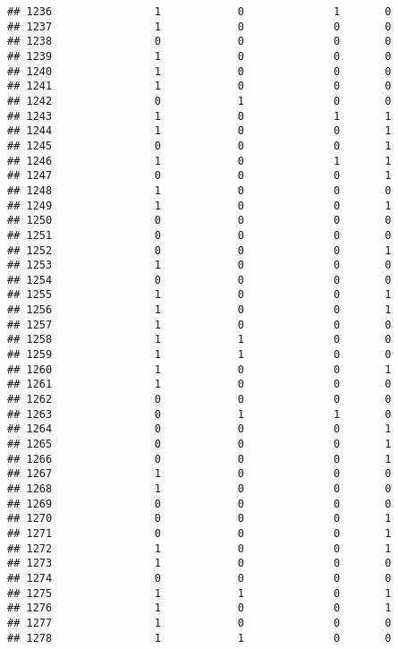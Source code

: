 \documentclass[]{article}
\begin{document}
\begin{verbatim}
## 1236                1            0              1       0
## 1237                1            0              0       0
## 1238                0            0              0       0
## 1239                1            0              0       0
## 1240                1            0              0       0
## 1241                1            0              0       0
## 1242                0            1              0       0
## 1243                1            0              1       1
## 1244                1            0              0       1
## 1245                0            0              0       1
## 1246                1            0              1       1
## 1247                0            0              0       1
## 1248                1            0              0       0
## 1249                1            0              0       1
## 1250                0            0              0       0
## 1251                0            0              0       0
## 1252                0            0              0       1
## 1253                1            0              0       0
## 1254                0            0              0       0
## 1255                1            0              0       1
## 1256                1            0              0       1
## 1257                1            0              0       0
## 1258                1            1              0       0
## 1259                1            1              0       0
## 1260                1            0              0       1
## 1261                1            0              0       0
## 1262                0            0              0       0
## 1263                0            1              1       0
## 1264                0            0              0       1
## 1265                0            0              0       1
## 1266                0            0              0       1
## 1267                1            0              0       0
## 1268                1            0              0       0
## 1269                0            0              0       0
## 1270                0            0              0       1
## 1271                0            0              0       1
## 1272                1            0              0       1
## 1273                1            0              0       0
## 1274                0            0              0       0
## 1275                1            1              0       1
## 1276                1            0              0       1
## 1277                1            0              0       0
## 1278                1            1              0       0

\end{verbatim}
\end{document}
